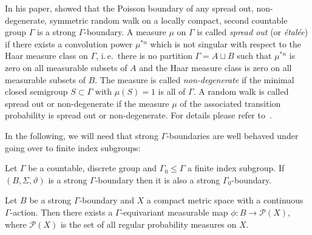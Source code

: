 \begin{bsp}
  \label{bsp:poisson}
  In his paper, \textcite[Theorem 3]{MR2006560} showed that the Poisson boundary of any spread out, non-degenerate, symmetric random walk on a locally compact, second countable group \(\Gamma\) is a strong \(\Gamma\)-boundary. A measure \(\mu\) on \(\Gamma\) is called \emph{spread out} (or \emph{étalée}) if there exists a convolution power \(\mu^{\ast n}\) which is not singular with respect to the Haar measure class on \(\Gamma\), i.\,e.\ there is no partition \(\Gamma = A \sqcup B\) such that \(\mu^{\ast n}\) is zero on all measurable subsets of \(A\) and the Haar measure class is zero on all measurable subsets of \(B\). The measure is called \emph{non-degenerate} if the minimal closed semigroup \(S \subset \Gamma\) with \(\mu(S) = 1\) is all of \(\Gamma\). A random walk is called spread out or non-degenerate if the measure \(\mu\) of the associated transition probability is spread out or non-degenerate. For details please refer to~\cite[Section 3]{MR2006560}.
\end{bsp}

In the following, we will need that strong \(\Gamma\)-boundaries are well behaved under going over to finite index subgroups:

\begin{thm}
  \label{thm:str-bnd-subgrp}
  Let \(\Gamma\) be a countable, discrete group and \(\Gamma_0 \leq \Gamma\) a finite index subgroup. If \((B, \Sigma, \vartheta)\) is a strong \(\Gamma\)-boundary then it is also a strong \(\Gamma_0\)-boundary.
\end{thm}

\begin{thm}
  \label{thm:p(x)}
  Let \(B\) be a strong \(\Gamma\)-boundary and \(X\) a compact metric space with a continuous \(\Gamma\)-action. Then there exists a \(\Gamma\)-equivariant measurable map \(\phi \colon B \to \mathcal{P}(X)\), where \(\mathcal{P}(X)\) is the set of all regular probability measures on \(X\).
\end{thm}

